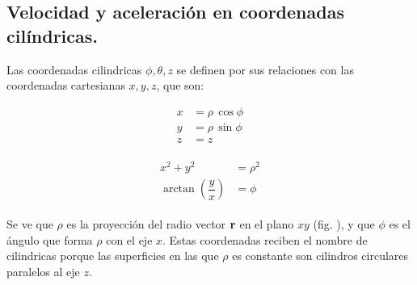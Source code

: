 \documentclass[12pt]{article}
\begin{document}
\subsection{Velocidad y aceleración en coordenadas cilíndricas.}

Las coordenadas cilindricas $\phi, \theta, z$ se definen por sus relaciones con las coordenadas cartesianas $x, y, z$, que son:

\vspace*{-1cm}
\begin{center}
\begin{minipage}[t]{0.3\linewidth}
\begin{align*}
x &= \rho \, \cos \phi \\
y &= \rho \, \sin \phi \\
z &= z
\end{align*}
\end{minipage}
\begin{minipage}[t]{0.3\linewidth}
\begin{align}
\begin{aligned}
x^{2} + y^{2} &= \rho^{2} \\
\arctan \left( \dfrac{y}{x} \right) &= \phi
\end{aligned}
\label{eq:ecuacion_02_10}
\end{align}
\end{minipage}
\end{center}
Se ve que $\rho$ es la proyección del radio vector $\vb{r}$ en el plano $x y$ (fig. ), y que $\phi$ es el ángulo que forma $\rho$ con el eje $x$. Estas coordenadas reciben el nombre de cilindricas porque las superficies en las que $\rho$ es constante son cilindros circulares paralelos al eje $z$.
\end{document}
